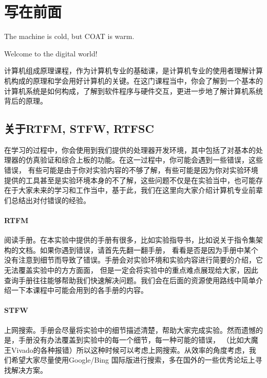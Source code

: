 \section{写在前面} \label{section: introduction}


\begin{flushright}
    The machine is cold, but COAT is warm.


    Welcome to the digital world!
\end{flushright}

\vspace*{2em}

计算机组成原理课程，作为计算机专业的基础课，是计算机专业的使用者理解计算机构成的原理和学会用好计算机的关键。在这门课程当中，你会了解到一个基本的计算机系统是如何构成，了解到软件程序与硬件交互，更进一步地了解计算机系统背后的原理。

\subsection{关于RTFM, STFW, RTFSC}

在学习的过程中，你会使用到我们提供的处理器开发环境，其中包括了对基本的处理器的仿真验证和综合上板的功能。在这一过程中，你可能会遇到一些错误，这些错误，
有些可能是由于你对实验内容的不够了解，有些可能是因为你对实验环境提供的工具甚至是实验环境本身的不了解，这些问题不仅是在实验当中，也可能存在于大家未来的学习和工作当中，基于此，我们在这里向大家介绍计算机专业前辈们总结出对付错误的经验。

\paragraph{\bfseries RTFM} 阅读手册。在本实验中提供的手册有很多，比如实验指导书，比如说关于指令集架构的文档。如果你遇到错误，请首先先翻一翻手册，
看看是否是因为手册中某个没有注意到细节而导致了错误。手册会对实验环境和实验内容进行简要的介绍，它无法覆盖实验中的方方面面，
但是一定会将实验中的重点难点展现给大家，因此查询手册往往能够帮助我们快速解决问题。我们会在后面的资源使用路线中简单介绍一下本课程中可能会用到的各手册的内容。

\paragraph{\bfseries STFW} 上网搜索。手册会尽量将实验中的细节描述清楚，帮助大家完成实验。然而遗憾的是，手册没有办法覆盖到实验中的每一个细节，每一种可能的错误，
（比如大魔王Vivado的各种报错）所以这种时候可以考虑上网搜索。从效率的角度考虑，我们希望大家尽量使用Google/Bing 国际版进行搜索，多在国外的一些优秀论坛上寻找解决方案。

